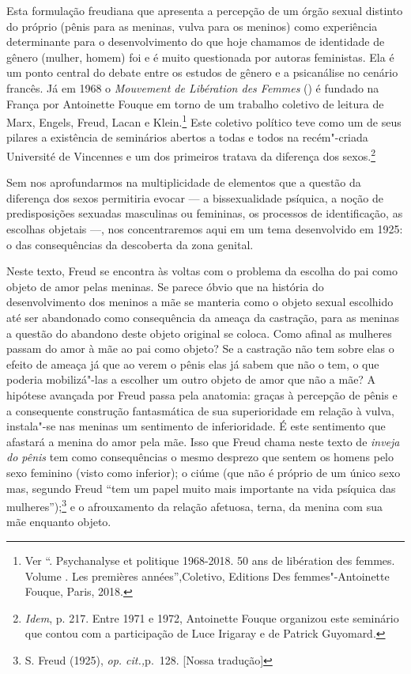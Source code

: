 Esta formulação freudiana que apresenta a percepção de um órgão sexual
distinto do próprio (pênis para as meninas, vulva para os meninos) como
experiência determinante para o desenvolvimento do que hoje chamamos de
identidade de gênero (mulher, homem) foi e é muito questionada por
autoras feministas. Ela é um ponto central do debate entre os estudos de
gênero e a psicanálise no cenário francês. Já em 1968 o \emph{Mouvement
de Libération des Femmes} () é fundado na França por Antoinette
Fouque em torno de um trabalho coletivo de leitura de Marx, Engels,
Freud, Lacan e Klein.\footnote{Ver ``. Psychanalyse et politique
  1968-2018. 50 ans de libération des femmes. Volume . Les premières
  années'',Coletivo, Editions Des femmes"-Antoinette Fouque, Paris, 2018.}
Este coletivo político teve como um de seus pilares a existência de
seminários abertos a todas e todos na recém"-criada Université de
Vincennes e um dos primeiros tratava da diferença dos sexos.\footnote{\emph{Idem},
  p. 217. Entre 1971 e 1972, Antoinette Fouque organizou este seminário
  que contou com a participação de Luce Irigaray e de Patrick Guyomard.}

Sem nos aprofundarmos na multiplicidade de elementos que a questão da
diferença dos sexos permitiria evocar --- a bissexualidade psíquica, a
noção de predisposições sexuadas masculinas ou femininas, os processos
de identificação, as escolhas objetais ---, nos concentraremos aqui em um
tema desenvolvido em 1925: o das consequências da descoberta da zona
genital.

Neste texto, Freud se encontra às voltas com o problema da escolha do
pai como objeto de amor pelas meninas. Se parece óbvio que na história
do desenvolvimento dos meninos a mãe se manteria como o objeto sexual
escolhido até ser abandonado como consequência da ameaça da castração,
para as meninas a questão do abandono deste objeto original se coloca.
Como afinal as mulheres passam do amor à mãe ao pai como objeto? Se a
castração não tem sobre elas o efeito de ameaça já que ao verem o pênis
elas já sabem que não o tem, o que poderia mobilizá"-las a escolher um
outro objeto de amor que não a mãe? A hipótese avançada por Freud passa
pela anatomia: graças à percepção de pênis e a consequente construção
fantasmática de sua superioridade em relação à vulva, instala"-se nas
meninas um sentimento de inferioridade. É este sentimento que afastará a
menina do amor pela mãe. Isso que Freud chama neste texto de
\emph{inveja do pênis} tem como consequências o mesmo desprezo que
sentem os homens pelo sexo feminino (visto como inferior); o ciúme (que
não é próprio de um único sexo mas, segundo Freud ``tem um papel muito
mais importante na vida psíquica das mulheres'');\footnote{S. Freud
  (1925), \emph{op. cit.,}p.~128. {[}Nossa tradução{]}} e o
afrouxamento da relação afetuosa, terna, da menina com sua mãe enquanto
objeto.

